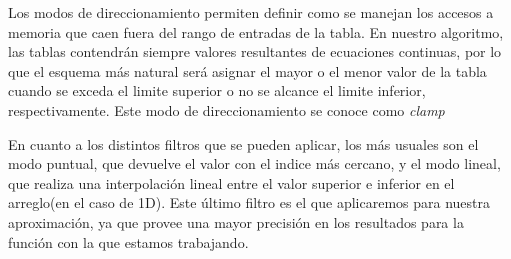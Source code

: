 Los modos de direccionamiento permiten definir como se manejan los accesos a memoria que caen fuera del rango de entradas de la tabla.
En nuestro algoritmo, las tablas contendrán siempre valores resultantes de ecuaciones continuas, por lo que el esquema más natural será asignar el mayor o el menor valor de la tabla cuando se exceda el limite superior o no se alcance el limite inferior, respectivamente. 
Este modo de direccionamiento se conoce como \textit{clamp}

  
  
En cuanto a los distintos filtros que se pueden aplicar, los más usuales son el modo puntual, que devuelve el valor con el indice más cercano, y el modo lineal, 
que realiza una interpolación lineal entre el valor superior e inferior en el arreglo(en el caso de 1D). 
Este último filtro es el que aplicaremos para nuestra aproximación, ya que provee una mayor precisión en los resultados para la función con la que estamos trabajando.



